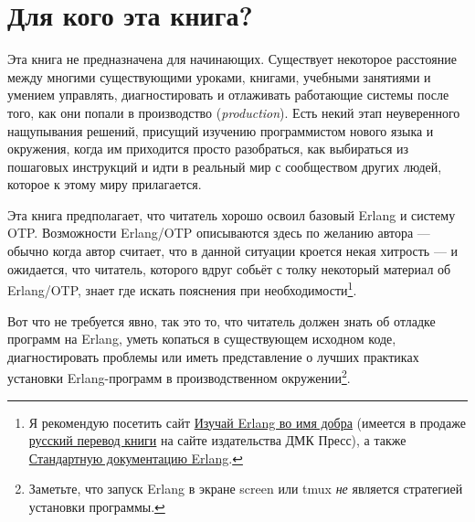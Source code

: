 \documentclass[11pt, oneside]{book}   	%
\begin{document}
\section*{Для кого эта книга?}
\label{sec:who-is-this-for}

Эта книга не предназначена для начинающих. Существует некоторое расстояние между многими существующими уроками, книгами, учебными занятиями и умением управлять, диагностировать и отлаживать работающие системы после того, как они попали в производство (\emph{production}). Есть некий этап неуверенного нащупывания решений, присущий изучению программистом нового языка и окружения, когда им приходится просто разобраться, как выбираться из пошаговых инструкций и идти в реальный мир с сообществом других людей, которое к этому миру прилагается.

Эта книга предполагает, что читатель хорошо освоил базовый Erlang и систему OTP. Возможности Erlang/OTP описываются здесь по желанию автора --- обычно когда автор считает, что в данной ситуации кроется некая хитрость --- и ожидается, что читатель, которого вдруг собьёт с толку некоторый материал об Erlang/OTP, знает где искать пояснения при необходимости\footnote{Я рекомендую посетить сайт \href{http://learnyousomeerlang.com}{Изучай Erlang во имя добра} (имеется в продаже \href{http://dmkpress.com/catalog/computer/programming/functional/978-5-97060-086-3/}{русский перевод книги} на сайте издательства ДМК Пресс), а также \href{http://www.erlang.org/erldoc}{Стандартную документацию Erlang}.}.

Вот что не требуется явно, так это то, что читатель должен знать об отладке программ на Erlang, уметь копаться в существующем исходном коде, диагностировать проблемы или иметь представление о лучших практиках установки Erlang-программ в производственном окружении\footnote{Заметьте, что запуск Erlang в экране screen или tmux \emph{не} является стратегией установки программы.}.
\end{document}
